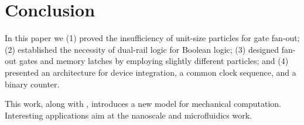 \documentclass[letterpaper, 10 pt, conference]{ieeeconf}
\begin{document}
\section{Conclusion}\label{sec:Conclusion}
In this paper we 
(1) proved the insufficiency of unit-size particles for gate fan-out; 
(2) established the necessity of dual-rail logic for Boolean logic;  
(3) designed {\sc fan-out} gates and memory latches by employing slightly different particles;
and (4) presented an architecture for device integration,  a common clock sequence, and a binary counter.

This work, along with \cite{Becker2013f,Becker2014,Becker2014a}, introduces a
new model for mechanical computation.  Interesting applications aim at the
nanoscale and microfluidics work.

    
   

\end{document}
